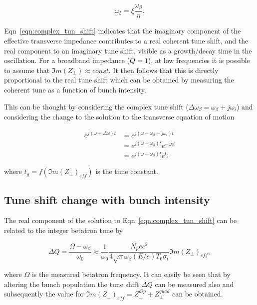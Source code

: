 \begin{equation}
\omega_{\xi} = \xi \frac{\omega_{\beta}}{\eta}.
\end{equation}

Eqn~\ref{eqn:complex_tun_shift} indicates that the imaginary component of the effective transverse impedance contributes to a real coherent tune shift, and the real component to an imaginary tune shift, visible as a growth/decay time in the oscillation. For a broadband impedance ($Q=1$), at low frequencies it is possible to assume that $\Im{}m\left(  Z_{\perp} \right) \approx const.$ It then follows that this is directly proportional to the real tune shift which can be obtained by measuring the coherent tune as a function of bunch intensity.

This can be thought by considering the complex tune shift ($\Delta \omega_{\beta} = \omega_{\beta} + j\omega_{i}$) and considering the change to the solution to the transverse equation of motion

\begin{align}
e^{j\left( \omega + \Delta \omega \right) t } &= e^{j\left( \omega + \omega_{\beta} + j \omega_{i} \right) t } \nonumber \\
& = e^{j\left( \omega + \omega_{\beta}\right) t }e^{- \omega_{i}  t } \nonumber \\
& = e^{j\left( \omega + \omega_{\beta}\right) t }e^{ t_{g} }
\end{align}

where $t_{g} = f ( \Im{}m { (  Z_{\perp} )_{eff} } )$ is the time constant.
 
\subsection{Tune shift change with bunch intensity}
\label{sec:tune-shift-bunch-int}

The real component of the solution to Eqn~\ref{eqn:complex_tun_shift} can be related to the integer betatron tune by

\begin{equation}
\Delta Q = \frac{\Omega - \omega_{\beta}}{\omega_{0}} \approx \frac{1}{\omega_{0}} \frac{N_{p}ec^{2}}{4\sqrt{\pi}\omega_{\beta} \left( E/e \right)T_{0}\sigma_{t}} \Im{}m\left(  Z_{\perp} \right)_{eff},
\end{equation} 

where $\Omega$ is the measured betatron frequency. It can easily be seen that by altering the bunch population the tune shift $\Delta Q$ can be measured also and subsequently the value for $\Im{}m\left(  Z_{\perp} \right)_{eff} = Z_{\perp}^{dip} + Z_{\perp}^{quad}$ can be obtained.

